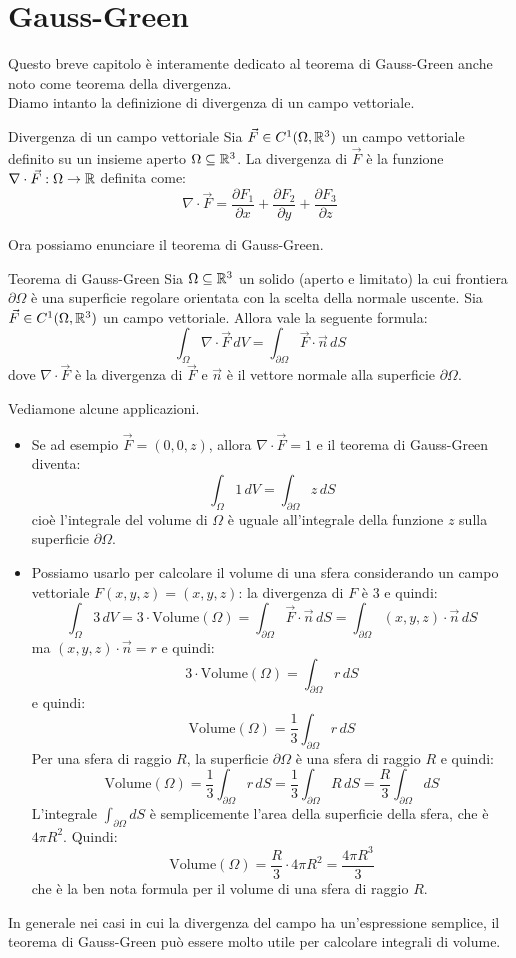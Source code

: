 \chapter{Gauss-Green}

Questo breve capitolo è interamente dedicato al teorema di Gauss-Green anche noto come teorema della divergenza.\\
Diamo intanto la definizione di divergenza di un campo vettoriale.
\begin{definizione}{Divergenza di un campo vettoriale}
  Sia $\vec{F} \in C^1(\Omega, \mathbb{R}^3)$ un campo vettoriale definito su un insieme aperto $\Omega \subseteq \mathbb{R}^3$. La divergenza di $\vec{F}$ è la funzione $\nabla \cdot \vec{F} : \Omega \to \mathbb{R}$ definita come:
  $$
    \nabla \cdot \vec{F} = \frac{\partial F_1}{\partial x} + \frac{\partial F_2}{\partial y} + \frac{\partial F_3}{\partial z}
  $$
\end{definizione}
Ora possiamo enunciare il teorema di Gauss-Green.
\begin{teorema}{Teorema di Gauss-Green}
 Sia $\Omega \subseteq \mathbb{R}^3$ un solido (aperto e limitato) la cui frontiera $\partial \Omega$ è una superficie regolare orientata con la scelta della normale uscente. Sia $\vec{F} \in C^1(\Omega, \mathbb{R}^3)$ un campo vettoriale. Allora vale la seguente formula:
  $$
    \int_{\Omega} \nabla \cdot \vec{F} \, dV = \int_{\partial \Omega} \vec{F} \cdot \vec{n} \, dS$$
  dove $\nabla \cdot \vec{F}$ è la divergenza di $\vec{F}$ e $\vec{n}$ è il vettore normale alla superficie $\partial \Omega$.
\end{teorema}

Vediamone alcune applicazioni.
\begin{itemize}
\item Se ad esempio $\vec{F} = (0, 0, z)$, allora $\nabla \cdot \vec{F} = 1$ e il teorema di Gauss-Green diventa:
  $$
    \int_{\Omega} 1 \, dV = \int_{\partial \Omega} z \, dS
  $$
  cioè l'integrale del volume di $\Omega$ è uguale all'integrale della funzione $z$ sulla superficie $\partial \Omega$.
\item Possiamo usarlo per calcolare il volume di una sfera considerando un campo vettoriale $F(x,y,z)=(x,y,z)$: la divergenza di $F$ è $3$ e quindi:
  $$
    \int_{\Omega} 3 \, dV = 3 \cdot \text{Volume}(\Omega) = \int_{\partial \Omega} \vec{F} \cdot \vec{n} \, dS = \int_{\partial \Omega} (x,y,z) \cdot \vec{n} \, dS
  $$
  ma $(x,y,z) \cdot \vec{n} = r$ e quindi:
  $$
    3 \cdot \text{Volume}(\Omega) = \int_{\partial \Omega} r \, dS
  $$
  e quindi:
  $$
    \text{Volume}(\Omega) = \frac{1}{3} \int_{\partial \Omega} r \, dS
  $$
  Per una sfera di raggio $R$, la superficie $\partial \Omega$ è una sfera di raggio $R$ e quindi:
  $$
    \text{Volume}(\Omega) = \frac{1}{3} \int_{\partial \Omega} r \, dS = \frac{1}{3} \int_{\partial \Omega} R \, dS = \frac{R}{3} \int_{\partial \Omega} dS
  $$
  L'integrale $\int_{\partial \Omega} dS$ è semplicemente l'area della superficie della sfera, che è $4 \pi R^2$. Quindi:
  $$
    \text{Volume}(\Omega) = \frac{R}{3} \cdot 4 \pi R^2 = \frac{4 \pi R^3}{3}
  $$
  che è la ben nota formula per il volume di una sfera di raggio $R$.
\end{itemize}

In generale nei casi in cui la divergenza del campo ha un'espressione semplice, il teorema di Gauss-Green può essere molto utile per calcolare integrali di volume.


